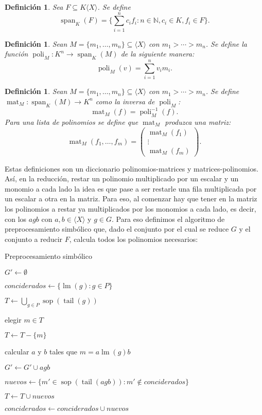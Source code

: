 \documentclass[12pt]{report}
\theoremstyle{customstyle}
\newtheorem{definition}[theorem]{Definición}
\theoremstyle{factstyle}
\DeclareMathOperator{\sop}{sop}
\DeclareMathOperator{\lm}{lm}
\DeclareMathOperator{\tail}{tail}
\DeclareMathOperator{\spn}{span} %
\DeclareMathOperator{\mat}{mat}
\DeclareMathOperator{\poli}{poli}
\begin{document}
\begin{definition}
  Sea $F ⊆ K⟨X⟩$. Se define
  \[ \spn_K(F) = \{∑_{i = 1}^n c_i f_i : n ∈ ℕ, c_i ∈ K, f_i ∈ F\} \text{.} \]
\end{definition}

\begin{definition}
  Sean $M = \{m_1, …, m_n\} ⊆ ⟨X⟩$ con $m_1 > ⋯ > m_n$. Se define la función $\poli_M : K^n → \spn_K(M)$ de la siguiente manera:
  \[ \poli_M(v) = ∑_{i = 1}^n v_i m_i \text{.} \]
\end{definition}

\begin{definition}
  Sean $M = \{m_1, …, m_n\} ⊆ ⟨X⟩$ con $m_1 > ⋯ > m_n$. Se define $\mat_M : \spn_K(M) → K^n$ como la inversa de $\poli_M$:
  \[ \mat_M(f) = \poli_M^{-1}(f) \text{.} \]
  Para una lista de polinomios se define que $\mat_M$ produzca una matriz:
  \[ \mat_M(f_1, …, f_m) = \begin{pmatrix} \mat_M(f_1) \\ ⋮ \\ \mat_M(f_m) \end{pmatrix} \text{.} \]
\end{definition}

Estas definiciones son un diccionario polinomios-matrices y matrices-polinomios. Así, en la reducción, restar un polinomio multiplicado por un escalar y un monomio a cada lado la idea es que pase a ser restarle una fila multiplicada por un escalar a otra en la matriz. Para eso, al comenzar hay que tener en la matriz los polinomios a restar ya multiplicados por los monomios a cada lado, es decir, con los $agb$ con $a,b ∈ ⟨X⟩$ y $g ∈ G$. Para eso definimos el algoritmo de preprocesamiento simbólico que, dado el conjunto por el cual se reduce $G$ y el conjunto a reducir $F$, calcula todos los polinomios necesarios:

\begin{algorithm}[H] %
  \caption{Preprocesamiento simbólico}\label{alg:Preprocesamiento simbólico}
  $G' ← ∅$

  $conciderados ← \{\lm(g) : g ∈ P\}$

  $T ← ⋃_{g ∈ P} \sop(\tail(g))$

   {
    elegir $m ∈ T$

    $T ← T - \{m\}$

     {
      \If{$\lm(g) | m$} {
        calcular $a$ y $b$ tales que $m = a \lm(g) b$

        $G' ← G' ∪ {agb}$

        $nuevos ← \{m' ∈ \sop(\tail(agb)) : m' ∉ conciderados\}$

        $T ← T ∪ nuevos$

        $conciderados ← conciderados ∪ nuevos$
      }
    }
  }

\end{algorithm}
\end{document}
